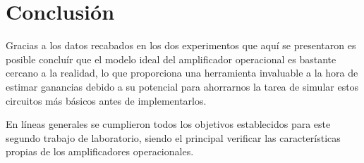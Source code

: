 \section{Conclusión}

Gracias a los datos recabados en los dos experimentos que aquí se presentaron
es posible concluír que el modelo ideal del amplificador operacional es 
bastante cercano a la realidad, lo que proporciona una herramienta invaluable
a la hora de estimar ganancias debido a su potencial para ahorrarnos la tarea
de simular estos circuitos más básicos antes de implementarlos.

En líneas generales se cumplieron todos los objetivos establecidos para este
segundo trabajo de laboratorio, siendo el principal verificar las 
características propias de los amplificadores operacionales.

